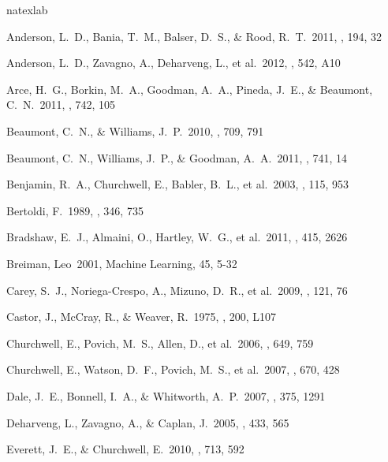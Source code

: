 \documentclass[preprint]{aastex}
\begin{document}
\begin{thebibliography}{16}
\expandafter\ifx\csname natexlab\endcsname\relax\def\natexlab#1{#1}\fi

 Anderson, L.~D., 
Bania, T.~M., Balser, D.~S., \& Rood, R.~T.\ 2011, \apjs, 194, 32 

 Anderson, L.~D., Zavagno, A., Deharveng, L., et al.\ 2012, \aap, 542, A10 

 Arce, H.~G., Borkin, 
M.~A., Goodman, A.~A., Pineda, J.~E., 
\& Beaumont, C.~N.\ 2011, \apj, 742, 105

 Beaumont, C.~N., \& Williams, J.~P.\ 2010, \apj, 709, 791 

 Beaumont, C.~N., 
Williams, J.~P., \& Goodman, A.~A.\ 2011, \apj, 741, 14 

 Benjamin, R.~A., 
Churchwell, E., Babler, B.~L., et al.\ 2003, \pasp, 115, 953 

 Bertoldi, F.\ 1989, \apj, 
346, 735 

 Bradshaw, E.~J., 
Almaini, O., Hartley, W.~G., et al.\ 2011, \mnras, 415, 2626 

 Breiman, Leo\ 2001, Machine Learning, 45, 5-32

 Carey, S.~J., 
Noriega-Crespo, A., Mizuno, D.~R., et al.\ 2009, \pasp, 121, 76 

 Castor, J., McCray, R., 
\& Weaver, R.\ 1975, \apjl, 200, L107 

 Churchwell, E., 
Povich, M.~S., Allen, D., et al.\ 2006, \apj, 649, 759 

 Churchwell, E., 
Watson, D.~F., Povich, M.~S., et al.\ 2007, \apj, 670, 428 

 Dale, J.~E., Bonnell, 
I.~A., \& Whitworth, A.~P.\ 2007, \mnras, 375, 1291 

 Deharveng, L., Zavagno, A., \& Caplan, J.\ 2005, \aap, 433, 565 

 Everett, J.~E., \& Churchwell, E.\ 2010, \apj, 713, 592 


\end{thebibliography}
\end{document}
